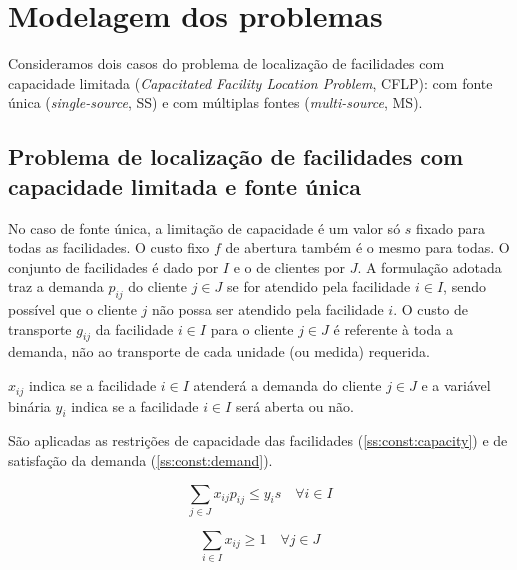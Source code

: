 \documentclass[]{article}
\title{}
\author{Guilherme Akira Demenech Mori}
\begin{document}
\maketitle

\begin{abstract}

\end{abstract}

\section{Modelagem dos problemas}

	Consideramos dois casos do problema de localização de facilidades com capacidade limitada 
	(\textit{Capacitated Facility Location Problem}, CFLP):
	com fonte única (\textit{single-source}, SS) 
	e com múltiplas fontes (\textit{multi-source}, MS). 
	
	\subsection{Problema de localização de facilidades com capacidade limitada e fonte única}
	
	No caso de fonte única, a limitação de capacidade é um valor só $s$ fixado para todas as facilidades.
	O custo fixo $f$ de abertura também é o mesmo para todas.
	O conjunto de facilidades é dado por $I$ e o de clientes por $J$.
	A formulação adotada traz a demanda $p_{ij}$ do cliente $j \in J$ se for atendido pela facilidade $i \in I$, 
	sendo possível que o cliente $j$ não possa ser atendido pela facilidade $i$.
	O custo de transporte $g_{ij}$ da facilidade $i \in I$ para o cliente $j \in J$ é referente à toda a demanda, não ao transporte de cada unidade (ou medida) requerida.
	
	$x_{ij}$ indica se a facilidade $i \in I$ atenderá a demanda do cliente $j \in J$ 
	e a variável binária $y_i$ indica se a facilidade $i \in I$ será aberta ou não.
	
	São aplicadas as restrições de capacidade das facilidades (\ref{ss:const:capacity}) e de satisfação da demanda (\ref{ss:const:demand}).
	
	\begin{equation}
		\label{ss:const:capacity}		
		\sum_{j \in J} x_{ij} p_{ij} \le y_i s 
		\quad
		\forall i \in I
	\end{equation}	

	\begin{equation}
		\label{ss:const:demand}		
		\sum_{i \in I} x_{ij} \ge 1 
		\quad
		\forall j \in J
	\end{equation}
\end{document}
